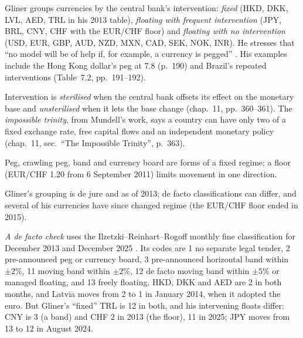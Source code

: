 \begin{qfdefinition}\label{def:currency-regimes-intervention}
 Gliner groups currencies by the central bank's intervention: \emph{fixed} (HKD, DKK, LVL, AED, TRL in his 2013 table), \emph{floating with frequent intervention} (JPY, BRL, CNY, CHF with the EUR/CHF floor) and \emph{floating with no intervention} (USD, EUR, GBP, AUD, NZD, MXN, CAD, SEK, NOK, INR). He stresses that ``no model will be of help if, for example, a currency is pegged'' \citep[chap.~7, sec.\ ``Currency Regimes'', PDF pp.~185--194]{s7-gliner}. His examples include the Hong Kong dollar's peg at 7.8 (p.~190) and Brazil's repeated interventions (Table~7.2, pp.~191--192).

Intervention is \emph{sterilised} when the central bank offsets its effect on the monetary base and \emph{unsterilised} when it lets the base change (chap.~11, pp.~360--361). The \emph{impossible trinity}, from Mundell's work, says a country can have only two of a fixed exchange rate, free capital flows and an independent monetary policy (chap.~11, sec.\ ``The Impossible Trinity'', p.~363).

 Peg, crawling peg, band and currency board are forms of a fixed regime; a floor (EUR/CHF 1.20 from 6 September 2011) limits movement in one direction.

 Gliner's grouping is de jure and as of 2013; de facto classifications can differ, and several of his currencies have since changed regime (the EUR/CHF floor ended in 2015).

\emph{A de facto check} uses the Ilzetzki--Reinhart--Rogoff monthly fine classification for December 2013 and December 2025 \citep[sheets ``Classification'' and ``Fine'', last update 5 October 2026]{irr-era-2025}. Its codes are 1 no separate legal tender, 2 pre-announced peg or currency board, 3 pre-announced horizontal band within $\pm2\%$, 11 moving band within $\pm2\%$, 12 de facto moving band within $\pm5\%$ or managed floating, and 13 freely floating. HKD, DKK and AED are 2 in both months, and Latvia moves from 2 to 1 in January 2014, when it adopted the euro. But Gliner's ``fixed'' TRL is 12 in both, and his intervening floats differ: CNY is 3 (a band) and CHF 2 in 2013 (the floor), 11 in 2025; JPY moves from 13 to 12 in August 2024.


\end{qfdefinition}

